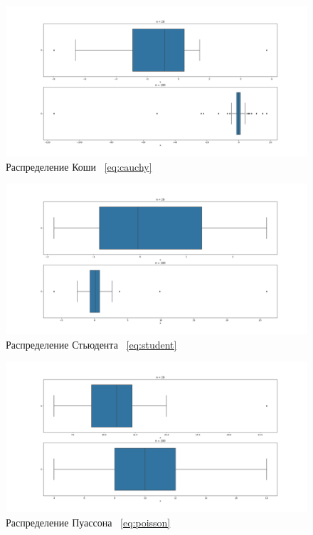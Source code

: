 \documentclass[12pt,a4paper]{article}
\begin{document}
	\begin{figure}[htbp!]
		\begin{center}
			\includegraphics[width = 1.12\linewidth]{graphics/lab2_cauchy.png}
			\caption{Распределение Коши \ \eqref{eq:cauchy}}
		\end{center}
	\end{figure}

	\newpage

	\begin{figure}[htbp!]
		\begin{center}
			\includegraphics[width = 1.12\linewidth]{graphics/lab2_student.png}
			\caption{Распределение Стьюдента \ \eqref{eq:student}}
		\end{center}
	\end{figure}

	\begin{figure}[htbp!]
		\begin{center}
			\includegraphics[width = 1.12\linewidth]{graphics/lab2_poisson.png}
			\caption{Распределение Пуассона \ \eqref{eq:poisson}}
		\end{center}
	\end{figure}
\end{document}
